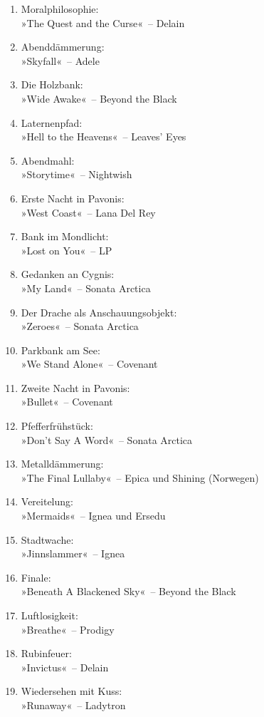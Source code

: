 \begin{enumerate}
    \item Moralphilosophie:\\ »The Quest and the Curse«~– Delain
    \item Abenddämmerung:\\ »Skyfall«~– Adele
    \item Die Holzbank:\\ »Wide Awake«~– Beyond the Black
    \item Laternenpfad:\\ »Hell to the Heavens«~– Leaves’ Eyes
    \item Abendmahl:\\ »Storytime«~– Nightwish
    \item Erste Nacht in Pavonis:\\ »West Coast«~– Lana Del Rey
    \item Bank im Mondlicht:\\ »Lost on You«~– LP
    \item Gedanken an Cygnis:\\ »My Land«~– Sonata Arctica
    \item Der Drache als Anschauungsobjekt:\\ »Zeroes«~– Sonata Arctica
    \item Parkbank am See:\\ »We Stand Alone«~– Covenant
    \item Zweite Nacht in Pavonis:\\ »Bullet«~– Covenant
    \item Pfefferfrühstück:\\ »Don’t Say A Word«~– Sonata Arctica
    \item Metalldämmerung:\\ »The Final Lullaby«~– Epica und Shining (Norwegen)
    \item Vereitelung:\\ »Mermaids«~– Ignea und Ersedu
    \item Stadtwache:\\ »Jinnslammer«~– Ignea
    \item Finale:\\ »Beneath A Blackened Sky«~– Beyond the Black
    \item Luftlosigkeit:\\ »Breathe«~– Prodigy
    \item Rubinfeuer:\\ »Invictus«~– Delain
    \item Wiedersehen mit Kuss:\\ »Runaway«~– Ladytron

\end{enumerate}
